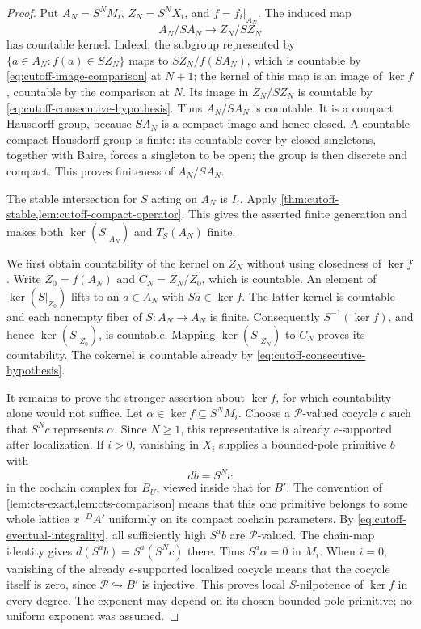 \begin{proof}
Put $A_N=S^NM_i$, $Z_N=S^NX_i$, and $f=f_i|_{A_N}$.
The induced map
\[
 A_N/SA_N\longrightarrow Z_N/SZ_N
\]
has countable kernel.  Indeed, the subgroup represented by
$\{a\in A_N:f(a)\in SZ_N\}$ maps to
$SZ_N/f(SA_N)$, which is countable by
\cref{eq:cutoff-image-comparison} at $N+1$; the kernel of this
map is an image of $\ker f$, countable by the comparison at $N$.
Its image in $Z_N/SZ_N$ is countable by
\cref{eq:cutoff-consecutive-hypothesis}.  Thus $A_N/SA_N$ is
countable.  It is a compact Hausdorff group, because $SA_N$ is a
compact image and hence closed.  A countable compact Hausdorff
group is finite: its countable cover by closed singletons, together
with Baire, forces a singleton to be open; the group is then
discrete and compact.  This proves finiteness of $A_N/SA_N$.

The stable intersection for $S$ acting on $A_N$ is $I_i$.
Apply \cref{thm:cutoff-stable,lem:cutoff-compact-operator}.
This gives the asserted finite generation and makes both
$\ker(S|_{A_N})$ and $T_S(A_N)$ finite.

We first obtain countability of the kernel on $Z_N$ without using
closedness of $\ker f$.  Write $Z_0=f(A_N)$ and
$C_N=Z_N/Z_0$, which is countable.  An element of
$\ker(S|_{Z_0})$ lifts to an $a\in A_N$ with
$Sa\in\ker f$.  The latter kernel is countable and each
nonempty fiber of $S:A_N\to A_N$ is finite.  Consequently
$S^{-1}(\ker f)$, and hence $\ker(S|_{Z_0})$, is countable.
Mapping $\ker(S|_{Z_N})$ to $C_N$ proves its countability.
The cokernel is countable already by
\cref{eq:cutoff-consecutive-hypothesis}.

It remains to prove the stronger assertion about $\ker f$, for
which countability alone would not suffice.  Let
$\alpha\in\ker f\subseteq S^NM_i$.  Choose a
$\mathcal P$-valued cocycle $c$ such that $S^Nc$ represents
$\alpha$.  Since $N\geq1$, this representative is already
$e$-supported after localization.  If $i>0$, vanishing in $X_i$
supplies a bounded-pole primitive $b$ with
\[
 db=S^Nc
\]
in the cochain complex for $B_U$, viewed inside that for $B'$.
The convention of \cref{lem:cts-exact,lem:cts-comparison} means
that this one primitive belongs to some whole lattice
$x^{-D}A'$ uniformly on its compact cochain parameters.
By \cref{eq:cutoff-eventual-integrality}, all sufficiently high
$S^ab$ are $\mathcal P$-valued.  The chain-map identity gives
$d(S^ab)=S^a(S^Nc)$ there.  Thus $S^a\alpha=0$ in $M_i$.
When $i=0$, vanishing of the already $e$-supported localized cocycle
means that the cocycle itself is zero, since
$\mathcal P\hookrightarrow B'$ is injective.  This proves local
$S$-nilpotence of $\ker f$ in every degree.  The exponent may
depend on its chosen bounded-pole primitive; no uniform exponent
was assumed.


\end{proof}
